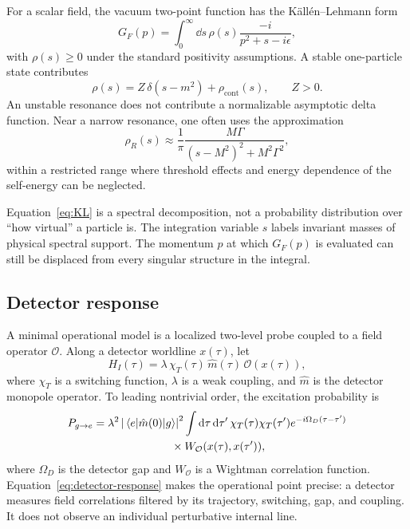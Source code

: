 \documentclass[11pt]{article}
\theoremstyle{remark}
\begin{document}
For a scalar field, the vacuum two-point function has the K\"all\'en--Lehmann form
\begin{equation}
  G_F(p)
  =\int_0^\infty \dd s\,\rho(s)
  \frac{-i}{p^2+s-i\epsilon},
  \label{eq:KL}
\end{equation}
with $\rho(s)\ge 0$ under the standard positivity assumptions. A stable one-particle state contributes
\begin{equation}
  \rho(s)=Z\,\delta(s-m^2)+\rho_{\mathrm{cont}}(s),
  \qquad Z>0.
  \label{eq:stable-pole-density}
\end{equation}
An unstable resonance does not contribute a normalizable asymptotic delta function. Near a narrow resonance, one often uses the approximation
\begin{equation}
  \rho_R(s)
  \approx \frac{1}{\pi}
  \frac{M\Gamma}{(s-M^2)^2+M^2\Gamma^2},
  \label{eq:breit-wigner}
\end{equation}
within a restricted range where threshold effects and energy dependence of the self-energy can be neglected.

Equation~\eqref{eq:KL} is a spectral decomposition, not a probability distribution over ``how virtual'' a particle is. The integration variable $s$ labels invariant masses of physical spectral support. The momentum $p$ at which $G_F(p)$ is evaluated can still be displaced from every singular structure in the integral.

\subsection{Detector response}

A minimal operational model is a localized two-level probe coupled to a field operator $\mathcal O$. Along a detector worldline $x(\tau)$, let
\begin{equation}
  H_I(\tau)
  =\lambda\,\chi_T(\tau)\,\hat m(\tau)\,\mathcal O(x(\tau)),
  \label{eq:UDW-interaction}
\end{equation}
where $\chi_T$ is a switching function, $\lambda$ is a weak coupling, and $\hat m$ is the detector monopole operator. To leading nontrivial order, the excitation probability is
\begin{align}
  P_{g\to e}
  ={}&\lambda^2
  \left|\matrixel{e}{\hat m(0)}{g}\right|^2
  \int \dd\tau\,\dd\tau'\,
  \chi_T(\tau)\chi_T(\tau')
  e^{-i\Omega_D(\tau-\tau')}
  \nonumber\\
  &\hspace{2cm}\times
  W_{\mathcal O}(x(\tau),x(\tau')),
  \label{eq:detector-response}
\end{align}
where $\Omega_D$ is the detector gap and $W_{\mathcal O}$ is a Wightman correlation function. Equation~\eqref{eq:detector-response} makes the operational point precise: a detector measures field correlations filtered by its trajectory, switching, gap, and coupling. It does not observe an individual perturbative internal line.
\end{document}
